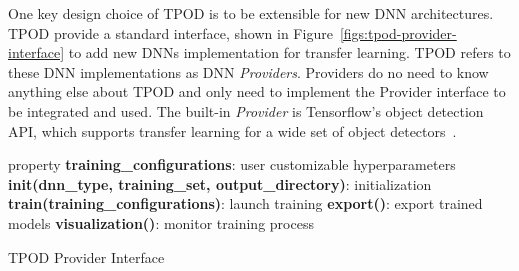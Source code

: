 One key design choice of TPOD is to be extensible for new DNN architectures.
TPOD provide a standard interface, shown in
Figure~\ref{figs:tpod-provider-interface} to add new DNNs implementation for
transfer learning. TPOD refers to these DNN implementations as DNN
\textit{Providers}. Providers do no need to know anything else about TPOD and
only need to implement the Provider interface to be integrated and used. The
built-in \textit{Provider} is Tensorflow's object detection API, which supports
transfer learning for a wide set of object detectors~\cite{tfod2019}. 


\begin{algorithm} 
\SetAlgoLined
 property \textbf{training\_configurations}: user customizable hyperparameters\;
 \textbf{init(dnn\_type, training\_set, output\_directory)}: initialization\;
 \textbf{train(training\_configurations)}: launch training\;
 \textbf{export()}: export trained models\;
 \textbf{visualization()}: monitor training process\;
\caption{TPOD Provider Interface}
\label{figs:tpod-provider-interface}
\end{algorithm}